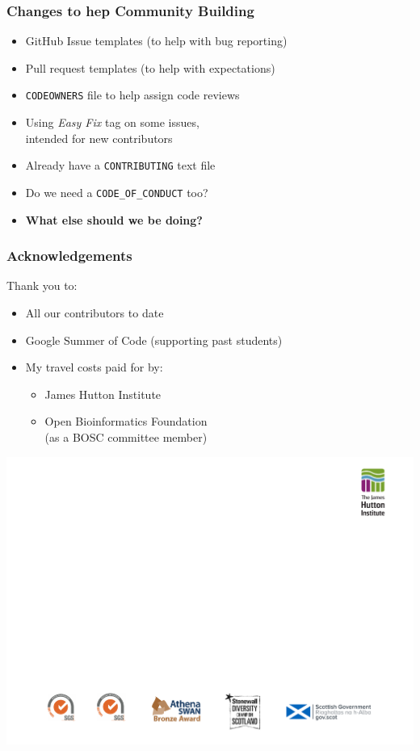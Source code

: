 \begin{frame}
\frametitle{Changes to hep Community Building}
\begin{itemize}
   \item GitHub Issue templates (to help with bug reporting)
   \item Pull request templates (to help with expectations)
   \item \texttt{CODEOWNERS} file to help assign code reviews
   \item Using \textit{Easy Fix} tag on some issues, \\ intended for new contributors
   \item Already have a \texttt{CONTRIBUTING} text file
   \item Do we need a \texttt{CODE\_OF\_CONDUCT} too?
   \item \textbf{What else should we be doing?}
\end{itemize}
\end{frame}


\begin{frame}
\frametitle{Acknowledgements}
Thank you to:
\begin{itemize}
    \item All our contributors to date
    \item Google Summer of Code (supporting past students)
    \item My travel costs paid for by:
    \begin{itemize}
       \item James Hutton Institute
       \item Open Bioinformatics Foundation \\
             (as a BOSC committee member)
    \end{itemize}
\end{itemize}

\vspace{1.1cm}
\center\includegraphics[width=0.9\paperwidth]{../images/Hutton-thanks-banner}
\end{frame}


